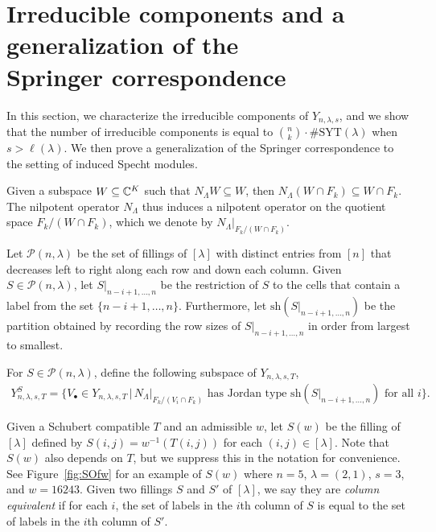 \documentclass[12pt]{amsart}
\newcommand{\st}{\,|\,}
\newcommand{\la}{\lambda}
\newcommand{\SYT}{\mathrm{SYT}}
\begin{document}
\section{Irreducible components and a generalization of the \\Springer correspondence}\label{sec:IrreducibleComponents}


In this section, we characterize the irreducible components of $Y_{n,\la,s}$, and we show that the number of irreducible components is equal to $\binom{n}{k}\cdot\#\SYT(\la)$ when $s>\ell(\la)$. We then prove a generalization of the Springer correspondence to the setting of induced Specht modules.


Given a subspace $W\subseteq \mathbb{C}^K$ such that $N_\Lambda W\subseteq W$, then $N_\Lambda(W\cap F_k)\subseteq W\cap F_k$. The nilpotent operator $N_\Lambda$ thus induces a nilpotent operator on the quotient space $F_k/(W\cap F_k)$, which we denote by $N_\Lambda|_{F_k/(W\cap F_k)}$.

Let $\mathcal{P}(n,\lambda)$ be the set of fillings of $[\lambda]$ with distinct entries from $[n]$ that decreases left to right along each row and down each column. Given $S\in \mathcal{P}(n,\la)$, let $S|_{n-i+1,\dots,n}$ be the restriction of $S$ to the cells that contain a label from the set $\{n-i+1,\dots,n\}$. Furthermore, let $\mathrm{sh}(S|_{n-i+1,\dots, n})$ be the partition obtained by recording the row sizes of $S|_{n-i+1,\dots, n}$ in order from largest to smallest. 

For $S\in \mathcal{P}(n,\la)$, define the following subspace of $Y_{n,\la,s,T}$,
\begin{align}
Y_{n,\la,s,T}^{S} = \{V_\bullet \in Y_{n,\la,s,T} \st N_\Lambda|_{F_k/(V_i\cap F_k)}\text{ has Jordan type }\mathrm{sh}(S|_{n-i+1,\dots,n})\text{ for all }i\}.
\end{align}

Given a Schubert compatible $T$ and an admissible $w$, let $S(w)$ be the filling of $[\la]$ defined by $S(i,j) = w^{-1}(T(i,j))$ for each $(i,j)\in [\la]$. Note that $S(w)$ also depends on $T$, but we suppress this in the notation for convenience. See Figure~\ref{fig:SOfw} for an example of $S(w)$ where $n=5$, $\la = (2,1)$, $s=3$, and $w=16243$. Given two fillings $S$ and $S'$ of $[\la]$, we say they are \emph{column equivalent} if for each $i$, the set of labels in the $i$th column of $S$ is equal to the set of labels in the $i$th column of $S'$.
\end{document}
